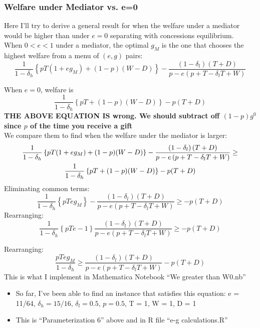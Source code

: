 \documentclass[12pt]{article}
\newcommand{\de}{\delta}
\begin{document}
								
\subsubsection{Welfare under Mediator vs. e=0}
\label{sec:WM0}
Here I'll try to derive a general result for when the welfare under a mediator would be higher than under $e=0$ separating with concessions equilibrium. \\

When $0<e<1$ under a mediator, the optimal $g_M$ is the one that chooses the highest welfare from a menu of $(e,g)$ pairs:
$$\frac{1}{1-\de_h}\left\{pT(1+eg_M) + (1-p)(W-D)\right\} - \frac{\left(1 - \de_l \right) \left( T + D \right)}{p - e \left( p + T - \de_l T + W \right)}$$

When $e=0$, welfare is $$\frac{1}{1-\de_h}\left\{pT + (1-p)(W-D)\right\} - p(T+D)$$
\textbf{THE ABOVE EQUATION IS wrong. We should subtract off $(1-p)g^0$ since $p$ of the time you receive a gift} \\

We compare them to find when the welfare under the mediator is larger:
	\begin{multline*}
		\frac{1}{1-\de_h}\left\{pT(1+eg_M) + (1-p)(W-D)\right\} - \frac{\left(1 - \de_l \right) \left( T + D \right)}{p - e \left( p + T - \de_l T + W \right)} \geq \\
		\frac{1}{1-\de_h}\left\{pT + (1-p)(W-D)\right\} - p(T+D)$$
	\end{multline*}							
Eliminating common terms:
	\begin{equation*}
		\frac{1}{1-\de_h}\left\{pTeg_M \right\} - \frac{\left(1 - \de_l \right) \left( T + D \right)}{p - e \left( p + T - \de_l T + W \right)} \geq - p(T+D)
	\end{equation*}	
Rearranging:
	\begin{equation*}
		\frac{1}{1-\de_h}\left\{pTe - 1 \right\} \frac{\left(1 - \de_l \right) \left( T + D \right)}{p - e \left( p + T - \de_l T + W \right)} \geq - p(T+D)
	\end{equation*}	

Rearranging:
\begin{equation*}
		\frac{pTeg_M}{1-\de_h} \geq \frac{\left(1 - \de_l \right) \left( T + D \right)}{p - e \left( p + T - \de_l T + W \right)} - p(T+D)
	\end{equation*}	
This is what I implement in Mathematica Notebook ``We greater than W0.nb''
\begin{itemize}
	\item So far, I've been able to find an instance that satisfies this equation: e = 11/64, $\de_h = 15/16$, $\de_l = 0.5$, $p = 0.5$, T = 1, W = 1, D = 1
	\item This is ``Parameterization 6'' above and in R file ``e-g calculations.R''
\end{itemize}
			
\end{document}
